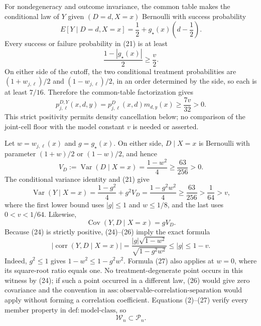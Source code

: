 For nondegeneracy and outcome invariance, the common table makes the conditional law of \(Y\) given \((D=d,X=x)\) Bernoulli with success probability
\[
E[Y\mid D=d,X=x]=\frac12+g_\star(x)\left(d-\frac12\right).
\tag{21}
\]
Every success or failure probability in (21) is at least
\[
\frac{1-|g_\star(x)|}{2}\ge\frac v2.
\tag{22}
\]
On either side of the cutoff, the two conditional treatment probabilities are \((1+w_{j,\ell})/2\) and \((1-w_{j,\ell})/2\), in an order determined by the side, so each is at least \(7/16\).  Therefore the common-table factorization gives
\[
p_{j,\ell}^{D,Y}(x,d,y)
=p_{j,\ell}^{D}(x,d)m_{d,y}(x)
\ge\frac{7v}{32}>0.
\tag{23}
\]
This strict positivity permits density cancellation below; no comparison of the joint-cell floor with the model constant \(v\) is needed or asserted.

Let \(w=w_{j,\ell}(x)\) and \(g=g_\star(x)\).  On either side, \(D\mid X=x\) is Bernoulli with parameter \((1+w)/2\) or \((1-w)/2\), and hence
\[
V_D:=\operatorname{Var}(D\mid X=x)=\frac{1-w^2}{4}\ge\frac{63}{256}>0.
\tag{24}
\]
The conditional variance identity and (21) give
\[
\operatorname{Var}(Y\mid X=x)
=\frac{1-g^2}{4}+g^2V_D
=\frac{1-g^2w^2}{4}
\ge\frac{63}{256}>\frac1{64}>v,
\tag{25}
\]
where the first lower bound uses \(|g|\le1\) and \(w\le1/8\), and the last uses \(0<v<1/64\).  Likewise,
\[
\operatorname{Cov}(Y,D\mid X=x)=gV_D.
\tag{26}
\]
Because (24) is strictly positive, (24)--(26) imply the exact formula
\[
|\operatorname{corr}(Y,D\mid X=x)|
=\frac{|g|\sqrt{1-w^2}}{\sqrt{1-g^2w^2}}
\le |g|\le1-v.
\tag{27}
\]
Indeed, \(g^2\le1\) gives \(1-w^2\le1-g^2w^2\).  Formula (27) also applies at \(w=0\), where its square-root ratio equals one.  No treatment-degenerate point occurs in this witness by (24); if such a point occurred in a different law, (26) would give zero covariance and the convention in \(\mathrm{ass:observable\mbox{-}correlation\mbox{-}separation}\) would apply without forming a correlation coefficient.  Equations (2)--(27) verify every member property in \(\mathrm{def:model\mbox{-}class}\), so
\[
\mathcal W_n\subset\mathcal P_n.
\tag{28}
\]

